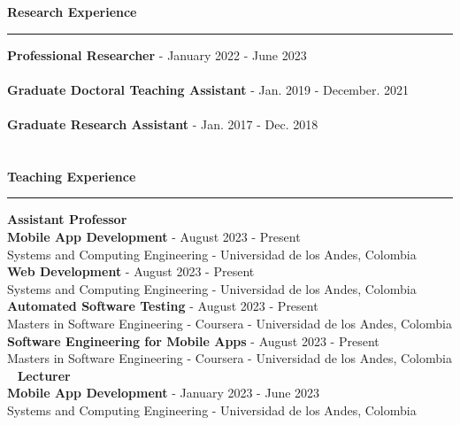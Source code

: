 \documentclass[letterpaper,11pt,oneside]{article}
\begin{document}
\newpage
\noindent \Large{\textbf{Research Experience}} \\
\vspace{-2ex}
\hrule 
\normalsize
\vspace{2ex}
\noindent \indent \textbf{Professional Researcher} - January 2022 - June 2023\\
 \\
\noindent \indent \textbf{Graduate Doctoral Teaching Assistant} - Jan. 2019 - December. 2021\\
 \\
\noindent \indent \textbf{Graduate Research Assistant} - Jan. 2017 - Dec. 2018\\
 \\
\\
\noindent \Large{\textbf{Teaching Experience}} \\
\vspace{-2ex}
\hrule 
\normalsize
\vspace{2ex}
\noindent \large{\textbf{Assistant Professor}} \\
\indent \textbf{Mobile App Development} -  August 2023 - Present\\
\indent Systems and Computing Engineering - Universidad de los Andes, Colombia \\
\indent \textbf{Web Development} -  August 2023 - Present \\
\indent Systems and Computing Engineering - Universidad de los Andes, Colombia \\
\indent \textbf{Automated Software Testing} -  August 2023 - Present\\
\indent Masters in Software Engineering - Coursera - Universidad de los Andes, Colombia \\
\indent \textbf{Software Engineering for Mobile Apps} -  August 2023 - Present \\
\indent Masters in Software Engineering - Coursera - Universidad de los Andes, Colombia \vspace{0.2cm}\\ 
\noindent \large{\textbf{Lecturer}} \\
\indent \textbf{Mobile App Development} -  January 2023 - June 2023\\
\indent Systems and Computing Engineering - Universidad de los Andes, Colombia \\
\end{document}
